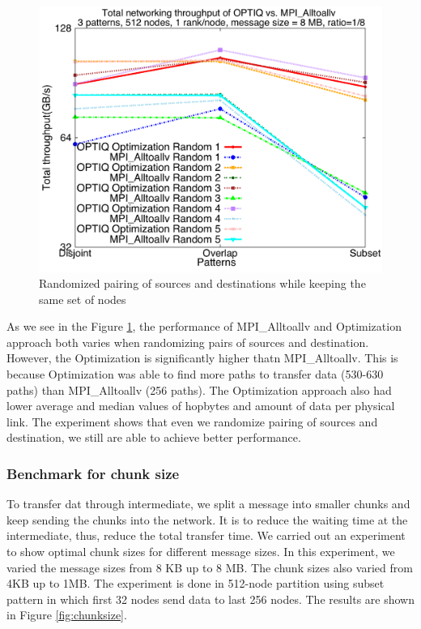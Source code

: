 \begin{figure}[!htb]
\vspace{-0.1in}
\centering
\includegraphics[scale=0.30]{figures/rand_opt_mpi.pdf}
\vspace{-0.1in}
\caption{Randomized pairing of sources and destinations while keeping the same set of nodes}
\vspace{-0.1in}
\label{fig:random}
\end{figure}

As we see in the Figure \ref{fig:random}, the performance of MPI\_Alltoallv and Optimization approach both varies when randomizing pairs of sources and destination. However, the Optimization is significantly higher thatn MPI\_Alltoallv. This is because Optimization was able to find more paths to transfer data (530-630 paths) than MPI\_Alltoallv (256 paths). The Optimization approach also had lower average and median values of hopbytes and amount of data per physical link. The experiment shows that even we randomize pairing of sources and destination, we still are able to achieve better performance.

\subsubsection{Benchmark for chunk size}

To transfer dat through intermediate, we split a message into smaller chunks and keep sending the chunks into the network. It is to reduce the waiting time at the intermediate, thus, reduce the total transfer time. We carried out an experiment to show optimal chunk sizes for different message sizes. In this experiment, we varied the message sizes from 8 KB up to 8 MB. The chunk sizes also varied from 4KB up to 1MB. The experiment is done in 512-node partition using subset pattern in which first 32 nodes send data to last 256 nodes. The results are shown in Figure \ref{fig:chunksize}.

